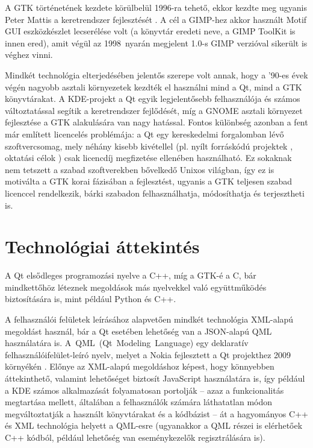 A GTK történetének kezdete körülbelül 1996-ra tehető, ekkor kezdte meg ugyanis Peter Mattis a keretrendszer fejlesztését \cite{GtkWiki}. A cél a GIMP-hez akkor használt Motif GUI eszközkészlet lecserélése volt (a könyvtár eredeti neve, a GIMP ToolKit is innen ered), amit végül az 1998~nyarán megjelent 1.0-s GIMP verzióval sikerült is véghez vinni.

Mindkét technológia elterjedésében jelentős szerepe volt annak, hogy a '90-es évek végén nagyobb asztali környezetek kezdték el használni mind a Qt, mind a GTK könyvtárakat. A KDE-projekt a Qt egyik legjelentősebb felhasználója és számos változtatással segítik a keretrendszer fejlődését, míg a GNOME asztali környezet fejlesztése a GTK alakulására van nagy hatással. Fontos különbség azonban a fent már említett licencelés problémája: a Qt egy kereskedelmi forgalomban lévő szoftvercsomag, mely néhány kisebb kivétellel (pl. nyílt forráskódú projektek \cite{QtOpenSource}, oktatási célok \cite{QtEdu}) csak licencdíj megfizetése ellenében használható. Ez sokaknak nem tetszett a szabad szoftverekben bővelkedő Unixos világban, így ez is motiválta a GTK korai fázisában a fejlesztést, ugyanis a GTK teljesen szabad licenccel rendelkezik, bárki szabadon felhasználhatja, módosíthatja és terjesztheti is.

\section{Technológiai áttekintés}
A Qt elsődleges programozási nyelve a C++, míg a GTK-é a C, bár mindkettőhöz léteznek megoldások más nyelvekkel való együttműködés biztosítására is, mint például Python és C++.

A felhasználói felületek leírásához alapvetően mindkét technológia XML-alapú megoldást használ, bár a Qt esetében lehetőség van a JSON-alapú QML használatára is. A~QML~(Qt~Modeling~Language) egy deklaratív felhasználóifelület-leíró nyelv, melyet a Nokia fejlesztett a Qt projekthez 2009 környékén \cite{QmlWiki}. Előnye az XML-alapú megoldáshoz képest, hogy könnyebben áttekinthető, valamint lehetőséget biztosít JavaScript használatára is, így például a KDE számos alkalmazását folyamatosan portolják -- azaz a funkcionalitás megtartása mellett, általában a felhasználók számára láthatatlan módon megváltoztatják a használt könyvtárakat és a kódbázist -- át a hagyományos C++ és XML technológia helyett a QML-esre (ugyanakkor a QML részei is elérhetőek C++ kódból, például lehetőség van eseménykezelők regisztrálására is).

